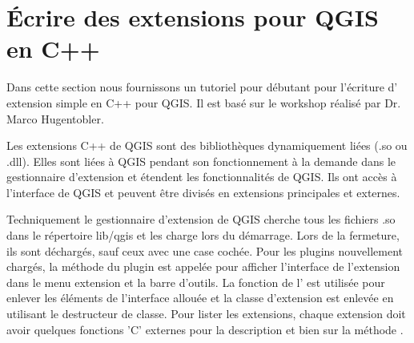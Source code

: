 
\section{Écrire des extensions pour QGIS en C++}\label{cpp_plugin}


Dans cette section nous fournissons un tutoriel pour débutant pour l'écriture d'
extension simple en C++ pour QGIS. Il est basé sur le workshop réalisé par Dr. 
Marco Hugentobler.

Les extensions C++ de QGIS sont des bibliothèques dynamiquement liées (.so ou .dll). 
Elles sont liées à QGIS pendant son fonctionnement à la demande dans le 
gestionnaire d'extension et étendent les fonctionnalités de QGIS. Ils ont accès à 
l'interface de QGIS et peuvent être divisés en extensions principales et externes.

Techniquement le gestionnaire d'extension de QGIS cherche tous les fichiers .so 
dans le répertoire lib/qgis et les charge lors du  démarrage. Lors de la 
fermeture, ils sont déchargés, sauf ceux avec une case cochée. Pour les plugins 
nouvellement chargés, la méthode  du plugin est appelée 
pour afficher l'interface de l'extension dans le menu extension et la barre d'outils. 
La fonction  de l' est utilisée pour enlever les éléments 
de l'interface allouée et la classe d'extension est enlevée en utilisant le 
destructeur de classe. Pour lister les extensions, chaque extension doit avoir 
quelques fonctions 'C' externes pour la description et bien sur la méthode 
.

